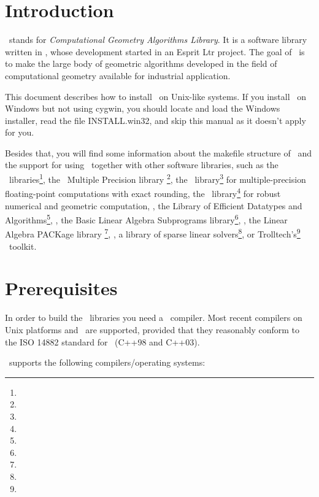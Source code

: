 \newcommand{\TTindex}[1]{\index{#1@{\tt #1}}}
\newcommand{\TTsubindex}[2]{\index{#1@{\tt #1}!{#2}}}
\newcommand{\TTsubindextwo}[2]{\index{#1!#2@{\tt #2} }}

\section{Introduction}

\cgal\ stands for \textit{Computational Geometry Algorithms Library}.
It is a software library written in \CC, whose development started in
an {\sc Esprit Ltr} project. The goal of \cgal\ is to make the large
body of geometric algorithms developed in the field of computational
geometry available for industrial application.

This document describes how to install \cgal\ on Unix-like systems.
If you install \cgal\ on Windows but not using cygwin, you should locate
and load the Windows installer, read the file INSTALL.win32, and skip
this manual as it doesn't apply for you.

Besides that, you will find some information about the makefile
structure of \cgal\ and the support for using \cgal\ together with
other software libraries, such as the \boost\
libraries\footnote{\boostpage}, the \gnu\ Multiple Precision library
\gmp\footnote{\gmppage}, the \mpfr\ library\footnote{\mpfrpage} for
multiple-precision floating-point computations with exact rounding,
the \core\ library\footnote{\corepage} for robust numerical and
geometric computation, \leda, the Library of Efficient Datatypes and
Algorithms\footnote{\ledapage}, \blas, the Basic Linear Algebra Subprograms
library\footnote{\blaspage}, \lapack, the Linear Algebra PACKage library
\footnote{\lapackpage}, \taucs, a library of sparse linear
solvers\footnote{\taucspage}, or Trolltech's\footnote{\trolltechpage}
\qt\ toolkit.

\section{Prerequisites\label{sec:prerequisites}}

In order to build the \cgal\ libraries you need a \CC\ compiler.  Most
recent compilers on Unix platforms and \mswin\ are supported, provided
that they reasonably conform to the ISO 14882 standard for \CC\ (C++98
and C++03).

\cgaldir\ supports the following compilers/operating systems:

